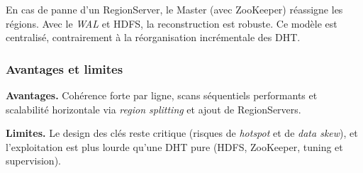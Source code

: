 En cas de panne d'un RegionServer, le Master (avec ZooKeeper) r\'eassigne les r\'egions. Avec le \emph{WAL} et HDFS, la reconstruction est robuste. Ce mod\`ele est centralis\'e, contrairement \`a la r\'eorganisation incr\'ementale des DHT.


\subsubsection{Avantages et limites}

\textbf{Avantages.} Coh\'erence forte par ligne, scans s\'equentiels performants et scalabilit\'e horizontale via \emph{region splitting} et ajout de RegionServers.

\textbf{Limites.} Le design des cl\'es reste critique (risques de \emph{hotspot} et de \emph{data skew}), et l'exploitation est plus lourde qu'une DHT pure (HDFS, ZooKeeper, tuning et supervision).